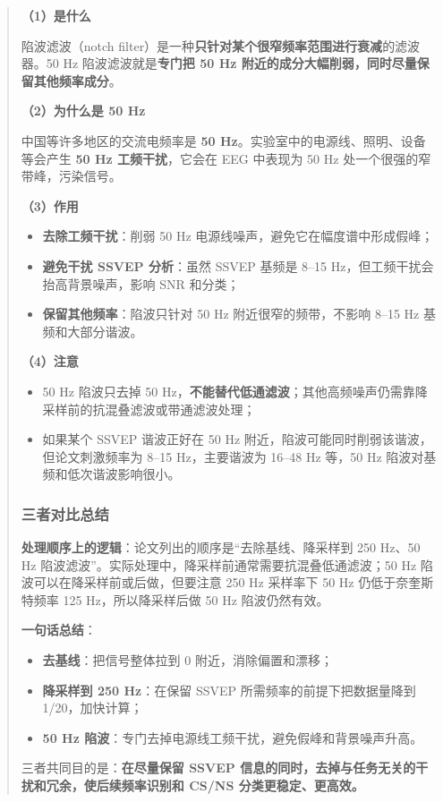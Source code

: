 \documentclass[12pt, a4paper]{ctexart}
\begin{document}
\begin{quote}
\textbf{（1）是什么}

陷波滤波（notch filter）是一种\textbf{只针对某个很窄频率范围进行衰减}的滤波器。50 Hz 陷波滤波就是\textbf{专门把 50 Hz 附近的成分大幅削弱，同时尽量保留其他频率成分}。

\textbf{（2）为什么是 50 Hz}

中国等许多地区的交流电频率是 \textbf{50 Hz}。实验室中的电源线、照明、设备等会产生 \textbf{50 Hz 工频干扰}，它会在 EEG 中表现为 50 Hz 处一个很强的窄带峰，污染信号。

\textbf{（3）作用}
\begin{itemize}
  \item \textbf{去除工频干扰}：削弱 50 Hz 电源线噪声，避免它在幅度谱中形成假峰；
  \item \textbf{避免干扰 SSVEP 分析}：虽然 SSVEP 基频是 8--15 Hz，但工频干扰会抬高背景噪声，影响 SNR 和分类；
  \item \textbf{保留其他频率}：陷波只针对 50 Hz 附近很窄的频带，不影响 8--15 Hz 基频和大部分谐波。
\end{itemize}

\textbf{（4）注意}
\begin{itemize}
  \item 50 Hz 陷波只去掉 50 Hz，\textbf{不能替代低通滤波}；其他高频噪声仍需靠降采样前的抗混叠滤波或带通滤波处理；
  \item 如果某个 SSVEP 谐波正好在 50 Hz 附近，陷波可能同时削弱该谐波，但论文刺激频率为 8--15 Hz，主要谐波为 16--48 Hz 等，50 Hz 陷波对基频和低次谐波影响很小。
\end{itemize}

\subsubsection*{三者对比总结}

\textbf{处理顺序上的逻辑}：论文列出的顺序是``去除基线、降采样到 250 Hz、50 Hz 陷波滤波''。实际处理中，降采样前通常需要抗混叠低通滤波；50 Hz 陷波可以在降采样前或后做，但要注意 250 Hz 采样率下 50 Hz 仍低于奈奎斯特频率 125 Hz，所以降采样后做 50 Hz 陷波仍然有效。

\textbf{一句话总结}：
\begin{itemize}
  \item \textbf{去基线}：把信号整体拉到 0 附近，消除偏置和漂移；
  \item \textbf{降采样到 250 Hz}：在保留 SSVEP 所需频率的前提下把数据量降到 1/20，加快计算；
  \item \textbf{50 Hz 陷波}：专门去掉电源线工频干扰，避免假峰和背景噪声升高。
\end{itemize}

三者共同目的是：\textbf{在尽量保留 SSVEP 信息的同时，去掉与任务无关的干扰和冗余，使后续频率识别和 CS/NS 分类更稳定、更高效。}
\end{quote}
\end{document}
